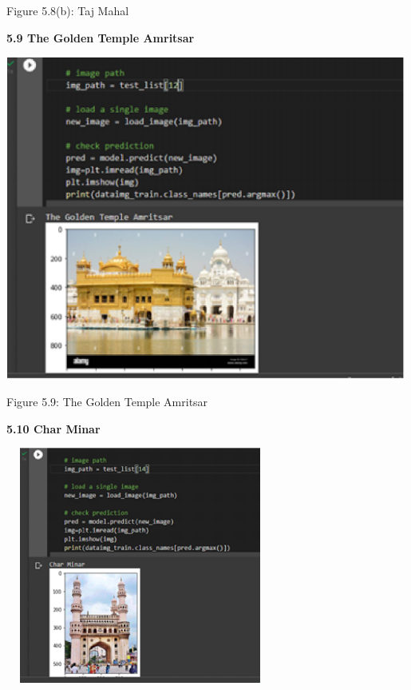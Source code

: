 \documentclass[10pt]{article} %
\begin{document}
\noindent 

\noindent Figure 5.8(b): Taj Mahal \newline

\newpage
\noindent \textbf{5.9 The Golden Temple Amritsar}\newline

\noindent \textbf{}

\noindent \includegraphics*[width=5.21in, height=4.20in, keepaspectratio=false]{image19}

\noindent Figure 5.9: The Golden Temple Amritsar

\newpage
\noindent \textbf{5.10 Char Minar}\newline

\noindent 

\noindent \includegraphics*[width=3.5in, height=3.07in, keepaspectratio=false]{image20}
\end{document}
